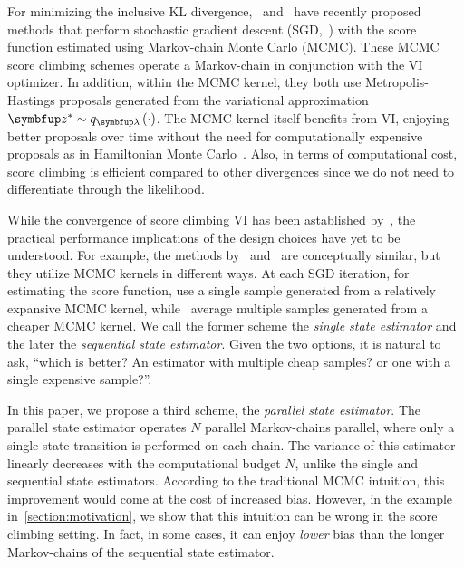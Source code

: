 For minimizing the inclusive KL divergence,~\citet{NEURIPS2020_b2070693} and~\citet{pmlr-v124-ou20a} have recently proposed  methods that perform stochastic gradient descent (SGD,~\citealt{robbins_stochastic_1951}) with the score function estimated using Markov-chain Monte Carlo (MCMC).
These MCMC score climbing schemes operate a Markov-chain in conjunction with the VI optimizer.
In addition, within the MCMC kernel, they both use Metropolis-Hastings proposals generated from the variational approximation \(\vz^* \sim q_{\vlambda}\left(\cdot\right)\).
The MCMC kernel itself benefits from VI, enjoying better proposals over time without the need for computationally expensive proposals as in Hamiltonian Monte Carlo~\citep{duane_hybrid_1987, neal_mcmc_2011, betancourt_conceptual_2017}.
Also, in terms of computational cost, score climbing is efficient compared to other divergences since we do not need to differentiate through the likelihood.

While the convergence of score climbing VI has been astablished by~\citet{NEURIPS2020_b2070693, gu_stochastic_1998}, the practical performance implications of the design choices have yet to be understood.
For example, the methods by~\citeauthor{NEURIPS2020_b2070693} and~\citet{pmlr-v124-ou20a} are conceptually similar, but they utilize MCMC kernels in different ways.
At each SGD iteration, for estimating the score function, \citeauthor{NEURIPS2020_b2070693} use a single sample generated from a relatively expansive MCMC kernel, while~\citeauthor{pmlr-v124-ou20a} average multiple samples generated from a cheaper MCMC kernel.
We call the former scheme the \textit{single state estimator} and the later the \textit{sequential state estimator}.
Given the two options, it is natural to ask, ``which is better? An estimator with multiple cheap samples? or one with a single expensive sample?''.

In this paper, we propose a third scheme, the \textit{parallel state estimator}.
The parallel state estimator operates \(N\) parallel Markov-chains parallel, where only a single state transition is performed on each chain.
The variance of this estimator linearly decreases with the computational budget \(N\), unlike the single and sequential state estimators.
According to the traditional MCMC intuition, this improvement would come at the cost of increased bias.
However, in the example in~\cref{section:motivation}, we show that this intuition can be wrong in the score climbing setting.
In fact, in some cases, it can enjoy \textit{lower} bias than the longer Markov-chains of the sequential state estimator.

